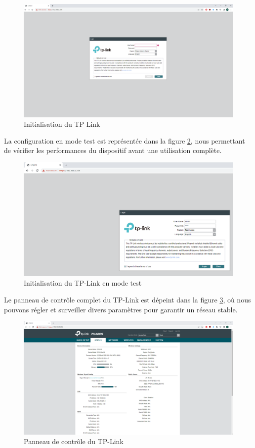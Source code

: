 \begin{figure}[H]
\centering
\includegraphics[width=15cm]{Images/tplink3.png}
\caption{Initialisation du TP-Link}
\label{Chap2.3.5}
\end{figure}

La configuration en mode test est représentée dans la figure \ref{Chap2.3.6}, nous permettant de vérifier les performances du dispositif avant une utilisation complète.

\begin{figure}[H]
\centering
\includegraphics[width=15cm]{Images/tplink33.png}
\caption{Initialisation du TP-Link en mode test}
\label{Chap2.3.6}
\end{figure}

Le panneau de contrôle complet du TP-Link est dépeint dans la figure \ref{Chap2.3.7}, où nous pouvons régler et surveiller divers paramètres pour garantir un réseau stable.

\begin{figure}[H]
\centering
\includegraphics[width=15cm]{Images/tplink34.png}
\caption{Panneau de contrôle du TP-Link}
\label{Chap2.3.7}
\end{figure}

